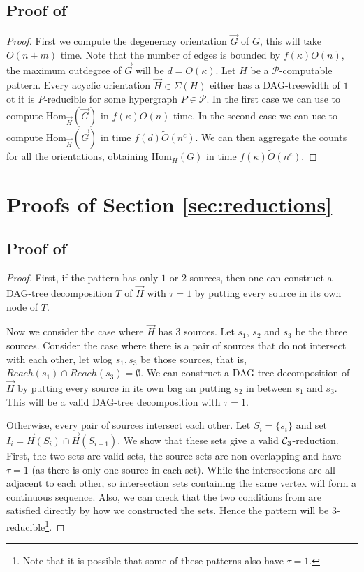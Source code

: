 \documentclass[a4paper,UKenglish,cleveref, autoref, numberwithinsect, thm-restate]{lipics-v2021}
\newcommand{\reducible}[1]{${#1}$-reducible}
\newcommand{\computable}[1]{${#1}$-computable}
\newcommand{\cycle}[1]{\cC_{#1}}
\newcommand{\Hom}[2]{\mathrm{Hom}_{#2}(#1)}
\newcommand{\Reachable}{Reach}
\newcommand{\degen}{\kappa}
\newcommand{\dtw}{\tau}
\newcommand{\dagtree}{DAG-tree decomposition}
\newcommand{\dagtreewidth}{DAG-treewidth}
\newcommand{\cC}{{\cal C}}
\newcommand{\cP}{\mathcal{P}}
\begin{document}
	\subsection{Proof of }
	
	\computablelemma*
	\begin{proof}
		First we compute the degeneracy orientation $\vec{G}$ of $G$, this will take $O(n+m)$ time. Note that the number of edges is bounded by $f(\degen)O(n)$, the maximum outdegree of $\vec{G}$ will be $d = O(\degen)$.
		Let $H$ be a \computable{\cP} pattern. Every acyclic orientation $\vec{H} \in \Sigma(H)$ either has a \dagtreewidth{} of $1$ ot it is \reducible{P} for some hypergraph $P\in \cP$. In the first case we can use  to compute $\Hom{\vec{G}}{\vec{H}}$ in $f(\degen)\tilde{O}(n)$ time. In the second case we can use  to compute $\Hom{\vec{G}}{\vec{H}}$ in time $f(d)\tilde{O}(n^c)$. We can then aggregate the counts for all the orientations, obtaining $\Hom{G}{H}$ in time $f(\degen)\tilde{O}(n^c)$.
	\end{proof}

	\section{Proofs of Section \ref{sec:reductions}}

	\subsection{Proof of }
		\threesources*
		\begin{proof}
		First, if the pattern has only $1$ or $2$ sources, then one can construct a \dagtree{} $T$ of $\vec{H}$ with $\dtw=1$ by putting every source in its own node of $T$.
		
		Now we consider the case where $\vec{H}$ has $3$ sources. Let $s_1$, $s_2$ and $s_3$ be the three sources. Consider the case where there is a pair of sources that do not intersect with each other, let wlog $s_1,s_3$ be those sources, that is, $\Reachable(s_1) \cap \Reachable(s_3) = \emptyset$. We can construct a \dagtree{} of $\vec{H}$ by putting every source in its own bag an putting $s_2$ in between $s_1$ and $s_3$. This will be a valid \dagtree{} with $\dtw=1$.
		
		Otherwise, every pair of sources intersect each other. Let $S_i = \{s_i\}$ and set $I_i = \vec{H}(S_i) \cap \vec{H}(S_{i+1})$. We show that these sets give a valid $\cycle{3}$-reduction. First, the two sets are valid sets, the source sets are non-overlapping and have $\dtw=1$ (as there is only one source in each set). While the intersections are all adjacent to each other, so intersection sets containing the same vertex will form a continuous sequence. Also, we can check that the two conditions from  are satisfied directly by how we constructed the sets. Hence the pattern will be \reducible{3}\footnote{Note that it is possible that some of these patterns also have $\dtw=1$.}. 
	\end{proof}
\end{document}

